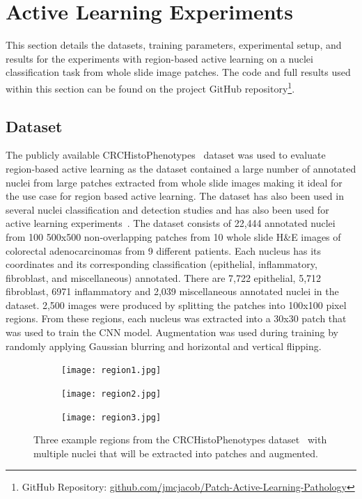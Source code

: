 \section{Active Learning Experiments}
\label{sec:active_experiments}
This section details the datasets, training parameters, experimental setup, and results for the experiments with region-based active learning on a nuclei classification task from whole slide image patches. The code and full results used within this section can be found on the project GitHub repository\footnote{GitHub Repository: \url{github.com/jmcjacob/Patch-Active-Learning-Pathology}}.

\subsection{Dataset}
\label{subsec:active_dataset}
The publicly available CRCHistoPhenotypes~\citep{sirinukunwattana2016locality} dataset was used to evaluate region-based active learning as the dataset contained a large number of annotated nuclei from large patches extracted from whole slide images making it ideal for the use case for region based active learning. The dataset has also been used in several nuclei classification and detection studies and has also been used for active learning experiments~\citep{shao2018deep}. The dataset consists of 22,444 annotated nuclei from 100 500x500 non-overlapping patches from 10 whole slide H\&E images of colorectal adenocarcinomas from 9 different patients. Each nucleus has its coordinates and its corresponding classification (epithelial, inflammatory, fibroblast, and miscellaneous) annotated. There are 7,722 epithelial, 5,712 fibroblast, 6971 inflammatory and 2,039 miscellaneous annotated nuclei in the dataset. 2,500 images were produced by splitting the patches into 100x100 pixel regions. From these regions, each nucleus was extracted into a 30x30 patch that was used to train the CNN model. Augmentation was used during training by randomly applying Gaussian blurring and horizontal and vertical flipping.

\begin{figure}[t!]
	\centering
	\begin{subfigure}{0.3\textwidth}
		\texttt{[image: region1.jpg]}
	\end{subfigure}
	\begin{subfigure}{0.3\textwidth}
		\texttt{[image: region2.jpg]}
	\end{subfigure}
	\begin{subfigure}{0.3\textwidth}
		\texttt{[image: region3.jpg]}
	\end{subfigure}
	\caption{Three example regions from the CRCHistoPhenotypes dataset~\cite{sirinukunwattana2016locality} with multiple nuclei that will be extracted into patches and augmented.}
	\label{fig:region_example}
\end{figure}

